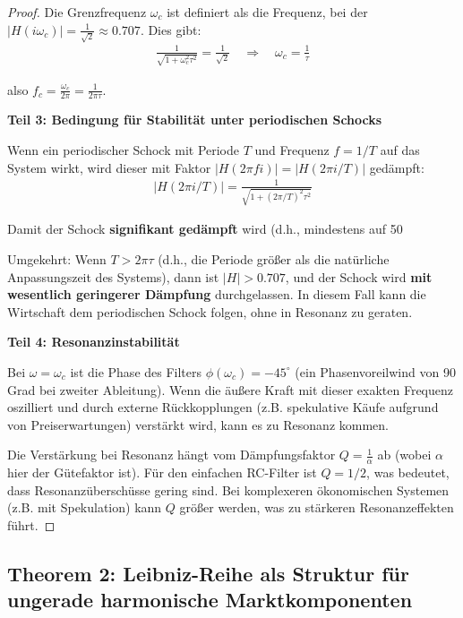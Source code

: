 \documentclass[a4paper,12pt,twoside]{report}
\theoremstyle{definition}
\begin{document}
\begin{proof}
Die Grenzfrequenz $\omega_c$ ist definiert als die Frequenz, bei der $|H(i\omega_c)| = \frac{1}{\sqrt{2}} \approx 0.707$. Dies gibt:
\begin{align}
\frac{1}{\sqrt{1 + \omega_c^2\tau^2}} = \frac{1}{\sqrt{2}} \quad \Rightarrow \quad \omega_c = \frac{1}{\tau}
\end{align}

also $f_c = \frac{\omega_c}{2\pi} = \frac{1}{2\pi\tau}$.

\textbf{Teil 3: Bedingung für Stabilität unter periodischen Schocks}

Wenn ein periodischer Schock mit Periode $T$ und Frequenz $f = 1/T$ auf das System wirkt, wird dieser mit Faktor $|H(2\pi f i)| = |H(2\pi i / T)|$ gedämpft:
\begin{align}
|H(2\pi i/T)| = \frac{1}{\sqrt{1 + (2\pi/T)^2\tau^2}}
\end{align}

Damit der Schock \textbf{signifikant gedämpft} wird (d.h., mindestens auf 50%

Umgekehrt: Wenn $T > 2\pi\tau$ (d.h., die Periode größer als die natürliche Anpassungszeit des Systems), dann ist $|H| > 0.707$, und der Schock wird \textbf{mit wesentlich geringerer Dämpfung} durchgelassen. In diesem Fall kann die Wirtschaft dem periodischen Schock folgen, ohne in Resonanz zu geraten.

\textbf{Teil 4: Resonanzinstabilität}

Bei $\omega = \omega_c$ ist die Phase des Filters $\phi(\omega_c) = -45^\circ$ (ein Phasenvoreilwind von 90 Grad bei zweiter Ableitung). Wenn die äußere Kraft mit dieser exakten Frequenz oszilliert und durch externe Rückkopplungen (z.B. spekulative Käufe aufgrund von Preiserwartungen) verstärkt wird, kann es zu Resonanz kommen.

Die Verstärkung bei Resonanz hängt vom Dämpfungsfaktor $Q = \frac{1}{\alpha}$ ab (wobei $\alpha$ hier der Gütefaktor ist). Für den einfachen RC-Filter ist $Q = 1/2$, was bedeutet, dass Resonanzüberschüsse gering sind. Bei komplexeren ökonomischen Systemen (z.B. mit Spekulation) kann $Q$ größer werden, was zu stärkeren Resonanzeffekten führt.

\end{proof}

\subsection*{Theorem 2: Leibniz-Reihe als Struktur für ungerade harmonische Marktkomponenten}
\end{document}
